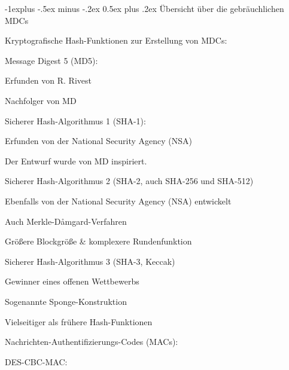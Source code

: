 \documentclass[a4paper]{article}
\makeatletter
\renewcommand{\subsection}{\@startsection{subsection}{2}{0mm}%
 {-1explus -.5ex minus -.2ex}%
 {0.5ex plus .2ex}%
 {\normalfont\normalsize\bfseries}}
\makeatother
\begin{document}
\begin{multicols}{3}
      \subsection{Übersicht über die gebräuchlichen
            MDCs}

      \begin{itemize*}
            \item Kryptografische Hash-Funktionen zur Erstellung von MDCs:
            \begin{itemize*}
                  \item Message Digest 5 (MD5):
                  \begin{itemize*} \item Erfunden von R. Rivest \item Nachfolger von MD \end{itemize*}
                  \item Sicherer Hash-Algorithmus 1 (SHA-1):
                  \begin{itemize*} \item Erfunden von der National Security Agency (NSA) \item Der Entwurf wurde von MD inspiriert. \end{itemize*}
                  \item Sicherer Hash-Algorithmus 2 (SHA-2, auch SHA-256 und SHA-512)
                  \begin{itemize*} \item Ebenfalls von der National Security Agency (NSA) entwickelt \item Auch Merkle-Dåmgard-Verfahren \item Größere Blockgröße \& komplexere Rundenfunktion \end{itemize*}
                  \item Sicherer Hash-Algorithmus 3 (SHA-3, Keccak)
                  \begin{itemize*} \item Gewinner eines offenen Wettbewerbs \item Sogenannte Sponge-Konstruktion \item Vielseitiger als frühere Hash-Funktionen \end{itemize*}
            \end{itemize*}
            \item Nachrichten-Authentifizierungs-Codes (MACs):
            \begin{itemize*}
                  \item DES-CBC-MAC:

\end{itemize*}
\end{itemize*}
\end{multicols}
\end{document}
